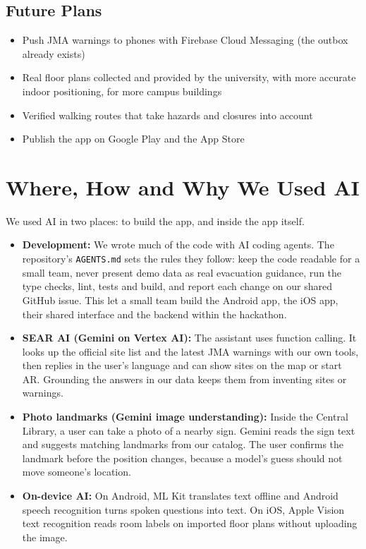 \documentclass[11pt,a4paper]{article}
\begin{document}
\subsection{Future Plans}
\begin{itemize}[leftmargin=1.4em,itemsep=2pt,topsep=4pt]
  \item Push JMA warnings to phones with Firebase Cloud Messaging (the outbox already exists)
  \item Real floor plans collected and provided by the university, with more accurate indoor
        positioning, for more campus buildings
  \item Verified walking routes that take hazards and closures into account
  \item Publish the app on Google Play and the App Store
\end{itemize}

\section{Where, How and Why We Used AI}

We used AI in two places: to build the app, and inside the app itself.

\begin{itemize}[leftmargin=1.4em,itemsep=3pt,topsep=4pt]
  \item \textbf{Development:} We wrote much of the code with AI coding agents. The
        repository's \texttt{AGENTS.md} sets the rules they follow: keep the code readable
        for a small team, never present demo data as real evacuation guidance, run the type
        checks, lint, tests and build, and report each change on our shared GitHub issue.
        This let a small team build the Android app, the iOS app, their shared interface
        and the backend within the hackathon.
  \item \textbf{SEAR AI (Gemini on Vertex AI):} The assistant uses function calling.
        It looks up the official site list and the latest JMA warnings with our own tools,
        then replies in the user's language and can show sites on the map or start AR.
        Grounding the answers in our data keeps them from inventing sites or warnings.
  \item \textbf{Photo landmarks (Gemini image understanding):} Inside the Central Library,
        a user can take a photo of a nearby sign. Gemini reads the sign text and suggests
        matching landmarks from our catalog. The user confirms the landmark before the
        position changes, because a model's guess should not move someone's location.
  \item \textbf{On-device AI:} On Android, ML Kit translates text offline and Android
        speech recognition turns spoken questions into text. On iOS, Apple Vision text
        recognition reads room labels on imported floor plans without uploading the image.
\end{itemize}
\end{document}
